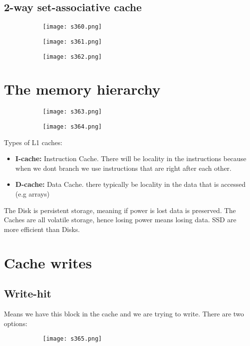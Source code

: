\documentclass[8pt]{extreport}
\begin{document}
\subsection{2-way set-associative cache}
\begin{figure}[H]
\begin{subfigure}[b]{0.4\linewidth}
\texttt{[image: s360.png]}
\end{subfigure}
\begin{subfigure}[b]{0.4\linewidth}
\texttt{[image: s361.png]}
\end{subfigure}
\begin{subfigure}[b]{0.4\linewidth}
\texttt{[image: s362.png]}
\end{subfigure}
\end{figure}

\section{The memory hierarchy}
\begin{figure}[H]
\begin{subfigure}[b]{0.4\linewidth}
\texttt{[image: s363.png]}
\end{subfigure}
\begin{subfigure}[b]{0.4\linewidth}
\texttt{[image: s364.png]}
\end{subfigure}
\end{figure}
Types of L1 caches:
\begin{itemize}
\item \textbf{I-cache:} Instruction Cache. There will be locality in the instructions because when we dont branch we use instructions that are right after each other.
\item \textbf{D-cache:} Data Cache. there typically be locality in the data that is accessed (e.g arrays)
\end{itemize}
The Disk is persistent storage, meaning if power is lost data is preserved. The Caches are all volatile storage, hence losing power means losing data. SSD are more efficient than Disks.

\section{Cache writes}

\subsection{Write-hit}
Means we have this block in the cache and we are trying to write. There are two options:
\begin{figure}[H]
\begin{subfigure}[b]{0.4\linewidth}
\texttt{[image: s365.png]}
\end{subfigure}
\end{figure}
\end{document}
